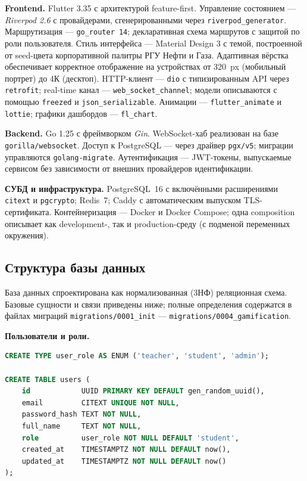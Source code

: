 \textbf{Frontend.} Flutter 3.35 с архитектурой feature-first.
Управление состоянием --- \textit{Riverpod 2.6} с провайдерами,
сгенерированными через \texttt{riverpod\_generator}.
Маршрутизация --- \texttt{go\_router 14}; декларативная схема
маршрутов с защитой по роли пользователя.
Стиль интерфейса --- Material Design 3 с темой, построенной
от seed-цвета корпоративной палитры РГУ Нефти и Газа.
Адаптивная вёрстка обеспечивает корректное отображение
на устройствах от 320~px (мобильный портрет) до 4К (десктоп).
HTTP-клиент --- \texttt{dio} с типизированным API через \texttt{retrofit};
real-time канал --- \texttt{web\_socket\_channel}; модели
описываются с помощью \texttt{freezed} и \texttt{json\_serializable}.
Анимации --- \texttt{flutter\_animate} и \texttt{lottie};
графики дашбордов --- \texttt{fl\_chart}.

\textbf{Backend.} Go 1.25 с фреймворком \textit{Gin}.
WebSocket-хаб реализован на базе \texttt{gorilla/websocket}.
Доступ к PostgreSQL --- через драйвер \texttt{pgx/v5}; миграции
управляются \texttt{golang-migrate}. Аутентификация ---
JWT-токены, выпускаемые сервисом без зависимости от внешних
провайдеров идентификации.

\textbf{СУБД и инфраструктура.} PostgreSQL~16 с включёнными
расширениями \texttt{citext} и \texttt{pgcrypto};
Redis~7; Caddy с автоматическим выпуском TLS-сертификата.
Контейнеризация --- Docker и Docker Compose; одна composition
описывает как development-, так и production-среду
(с подменой переменных окружения).

\subsection{Структура базы данных}

База данных спроектирована как нормализованная (3НФ) реляционная
схема. Базовые сущности и связи приведены ниже; полные определения
содержатся в файлах миграций \texttt{migrations/0001\_init} ---
\texttt{migrations/0004\_gamification}.

\textbf{Пользователи и роли.}
\begin{lstlisting}[language=SQL]
CREATE TYPE user_role AS ENUM ('teacher', 'student', 'admin');

CREATE TABLE users (
    id            UUID PRIMARY KEY DEFAULT gen_random_uuid(),
    email         CITEXT UNIQUE NOT NULL,
    password_hash TEXT NOT NULL,
    full_name     TEXT NOT NULL,
    role          user_role NOT NULL DEFAULT 'student',
    created_at    TIMESTAMPTZ NOT NULL DEFAULT now(),
    updated_at    TIMESTAMPTZ NOT NULL DEFAULT now()
);
\end{lstlisting}

